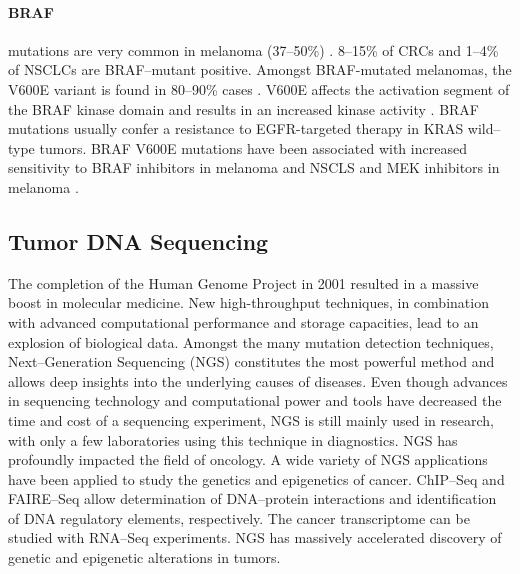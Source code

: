 {{      \paragraph{BRAF} mutations are very common in melanoma (37--50\%) {\cite{braf_melanoma}}. 8--15\%
      of CRCs {\cite{braf_crc}} and 1--4\% of NSCLCs {\cite{braf_nsclc}} are BRAF--mutant positive. Amongst
      BRAF-mutated melanomas, the V600E variant is found in 80--90\% cases {\cite{braf_melanoma}}.
      V600E affects the activation segment of the BRAF kinase domain and results
      in an increased kinase activity {\cite{v600e}}. BRAF mutations usually confer a
      resistance to EGFR-targeted therapy in KRAS wild--type tumors. BRAF V600E
      mutations have been associated with increased sensitivity to BRAF
      inhibitors in melanoma and NSCLS and MEK inhibitors in melanoma {\cite{braf_melanoma}}.

  \subsection{Tumor DNA Sequencing}

    The completion of the Human Genome Project in 2001 resulted in a massive
    boost in molecular medicine. New high-throughput techniques, in combination
    with advanced computational performance and storage capacities, lead to an
    explosion of biological data. Amongst the many mutation detection
    techniques, Next--Generation Sequencing (NGS) constitutes the most powerful
    method and allows deep insights into the underlying causes of diseases.
    Even though advances in sequencing technology and computational power and
    tools have decreased the time and cost of a sequencing experiment, NGS is
    still mainly used in research, with only a few laboratories using this
    technique in diagnostics. NGS has profoundly impacted the field of
    oncology. A wide variety of NGS applications have been applied to study the
    genetics and epigenetics of cancer. ChIP--Seq and FAIRE--Seq allow
    determination of DNA--protein interactions and identification of DNA
    regulatory elements, respectively. The cancer transcriptome can be studied
    with RNA--Seq experiments. NGS has massively accelerated discovery of
    genetic and epigenetic alterations in tumors.

}}
